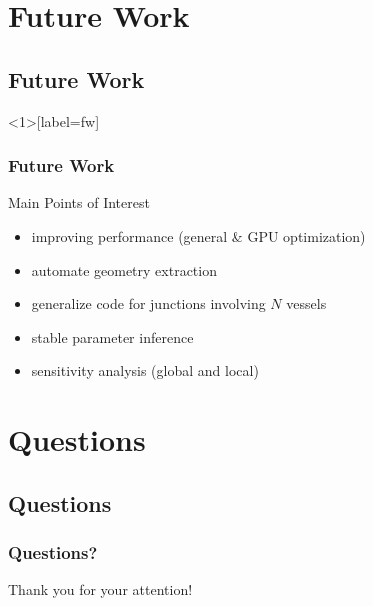 \documentclass[compress]{beamer}
\begin{document}
\begin{frame}

\end{frame}


\section{Future Work}
\subsection{Future Work}
\begin{frame}<1>[label=fw]
	\frametitle{Future Work}
	\begin{block}{Main Points of Interest}
		\begin{itemize}
			\item<2-> improving performance (general \& GPU optimization)
			\item<3-> automate geometry extraction
			\item<4-> generalize code for junctions involving $N$ vessels
			\item<5-> stable parameter inference
			\item<6-> sensitivity analysis (global and local)
		\end{itemize}
	\end{block}
	\vspace{5mm}
\end{frame}


\section{Questions}
\subsection{Questions}
\begin{frame}
	\frametitle{Questions?}
	Thank you for your attention!
\end{frame}
\end{document}
